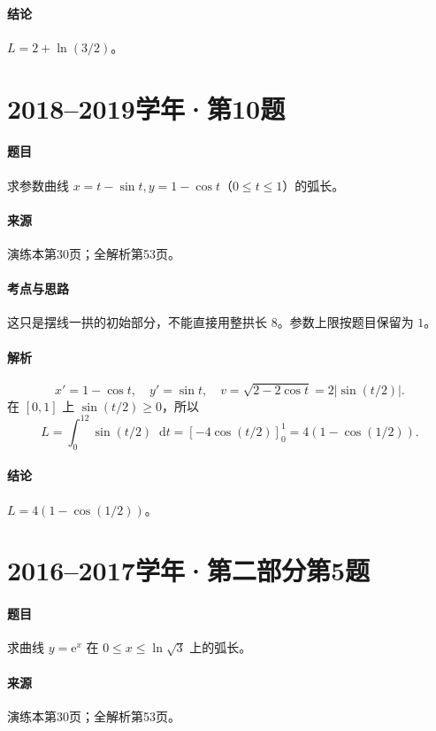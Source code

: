 \documentclass[UTF8,fontset=fandol,12pt,oneside,openany]{ctexrep}
\newcommand{\dd}{\mathop{}\!\mathrm d}
\newcommand{\ee}{\mathrm e}
\theoremstyle{definition}
\begin{document}
\paragraph{结论}$L=2+\ln(3/2)$。

\par\addvspace{18pt}\noindent\begin{minipage}{\linewidth}
\section{2018--2019学年·第10题}
\paragraph{题目}求参数曲线 $x=t-\sin t,y=1-\cos t$（$0\le t\le1$）的弧长。
\paragraph{来源}演练本第30页；全解析第53页。
\end{minipage}\par
\paragraph{考点与思路}这只是摆线一拱的初始部分，不能直接用整拱长 $8$。参数上限按题目保留为 $1$。
\paragraph{解析}
\[
 x'=1-\cos t,\quad y'=\sin t,
 \quad v=\sqrt{2-2\cos t}=2|\sin(t/2)|.
\]
在 $[0,1]$ 上 $\sin(t/2)\ge0$，所以
\[
 L=\int_0^12\sin(t/2)\dd t
 =[-4\cos(t/2)]_0^1=4(1-\cos(1/2)).
\]
\paragraph{结论}$L=4(1-\cos(1/2))$。

\par\addvspace{18pt}\noindent\begin{minipage}{\linewidth}
\section{2016--2017学年·第二部分第5题}
\paragraph{题目}求曲线 $y=\ee^x$ 在 $0\le x\le\ln\sqrt3$ 上的弧长。
\paragraph{来源}演练本第30页；全解析第53页。
\end{minipage}\par
\end{document}
